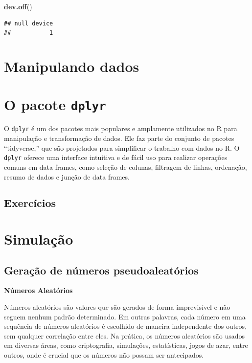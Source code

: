 \documentclass[
]{book}
\newenvironment{Shaded}{\begin{snugshade}}{\end{snugshade}}
\newcommand{\FunctionTok}[1]{\textcolor[rgb]{0.13,0.29,0.53}{\textbf{#1}}}
\newcommand{\NormalTok}[1]{#1}
\begin{document}
\begin{Shaded}
\begin{Highlighting}[]
\FunctionTok{dev.off}\NormalTok{()}
\end{Highlighting}
\end{Shaded}

\begin{verbatim}
## null device 
##           1
\end{verbatim}

\chapter{Manipulando dados}\label{manipulando-dados}

\chapter{\texorpdfstring{O pacote \texttt{dplyr}}{O pacote dplyr}}\label{o-pacote-dplyr}

O \texttt{dplyr} é um dos pacotes mais populares e amplamente utilizados no R para manipulação e transformação de dados. Ele faz parte do conjunto de pacotes ``tidyverse,'' que são projetados para simplificar o trabalho com dados no R. O \texttt{dplyr} oferece uma interface intuitiva e de fácil uso para realizar operações comuns em data frames, como seleção de colunas, filtragem de linhas, ordenação, resumo de dados e junção de data frames.

\section{Exercícios}\label{exercuxedcios-10}

\chapter{Simulação}\label{simulauxe7uxe3o}

\section{Geração de números pseudoaleatórios}\label{gerauxe7uxe3o-de-nuxfameros-pseudoaleatuxf3rios}

\textbf{Números Aleatórios}

Números aleatórios são valores que são gerados de forma imprevisível e não seguem nenhum padrão determinado. Em outras palavras, cada número em uma sequência de números aleatórios é escolhido de maneira independente dos outros, sem qualquer correlação entre eles. Na prática, os números aleatórios são usados em diversas áreas, como criptografia, simulações, estatísticas, jogos de azar, entre outros, onde é crucial que os números não possam ser antecipados.
\end{document}

